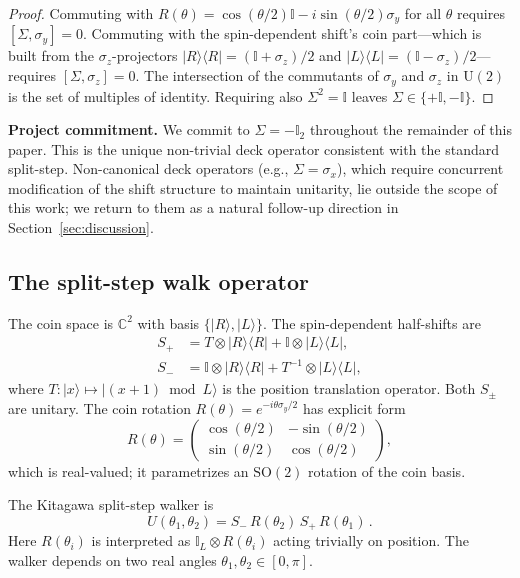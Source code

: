 \documentclass[aps,pra,reprint,amsmath,amssymb,superscriptaddress,nofootinbib,longbibliography]{revtex4-2}
\newcommand{\C}{\mathbb{C}}
\newcommand{\I}{\mathbb{I}}
\newcommand{\sigx}{\sigma_x}
\newcommand{\sigy}{\sigma_y}
\newcommand{\sigz}{\sigma_z}
\newcommand{\bra}[1]{\langle #1 |}
\newcommand{\ket}[1]{| #1 \rangle}
\begin{document}
\begin{proof}
Commuting with $R(\theta) = \cos(\theta/2)\I - i\sin(\theta/2)\sigy$ for all $\theta$ requires $[\Sigma, \sigy] = 0$. Commuting with the spin-dependent shift's coin part---which is built from the $\sigz$-projectors $\ket{R}\bra{R} = (\I + \sigz)/2$ and $\ket{L}\bra{L} = (\I - \sigz)/2$---requires $[\Sigma, \sigz] = 0$. The intersection of the commutants of $\sigy$ and $\sigz$ in $\mathrm{U}(2)$ is the set of multiples of identity. Requiring also $\Sigma^2 = \I$ leaves $\Sigma \in \{+\I, -\I\}$.
\end{proof}

\textbf{Project commitment.} We commit to $\Sigma = -\I_2$ throughout the remainder of this paper. This is the unique non-trivial deck operator consistent with the standard split-step. Non-canonical deck operators (e.g., $\Sigma = \sigx$), which require concurrent modification of the shift structure to maintain unitarity, lie outside the scope of this work; we return to them as a natural follow-up direction in Section~\ref{sec:discussion}.

\subsection{The split-step walk operator}
\label{sec:walker_def}

The coin space is $\C^2$ with basis $\{\ket{R}, \ket{L}\}$. The spin-dependent half-shifts are
\begin{align}
S_+ &= T \otimes \ket{R}\bra{R} + \I \otimes \ket{L}\bra{L}, \\
S_- &= \I \otimes \ket{R}\bra{R} + T^{-1} \otimes \ket{L}\bra{L},
\end{align}
where $T : \ket{x} \mapsto \ket{(x{+}1) \bmod L}$ is the position translation operator. Both $S_\pm$ are unitary. The coin rotation $R(\theta) = e^{-i\theta\sigy/2}$ has explicit form
\begin{equation}
R(\theta) = \begin{pmatrix} \cos(\theta/2) & -\sin(\theta/2) \\ \sin(\theta/2) & \cos(\theta/2) \end{pmatrix},
\end{equation}
which is real-valued; it parametrizes an $\mathrm{SO}(2)$ rotation of the coin basis.

The Kitagawa split-step walker is
\begin{equation}
\boxed{
U(\theta_1, \theta_2) = S_-\, R(\theta_2)\, S_+\, R(\theta_1)\, .
}
\label{eq:walker}
\end{equation}
Here $R(\theta_i)$ is interpreted as $\I_L \otimes R(\theta_i)$ acting trivially on position. The walker depends on two real angles $\theta_1, \theta_2 \in [0, \pi]$.
\end{document}
